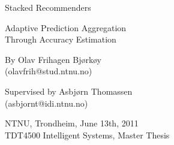 \null\vspace{6em}
{
\setlength{\parindent}{0em}
\setlength{\parskip}{1em}
\centering

\HUGE
Stacked Recommenders\\
\LARGE
\vspace{1em}

Adaptive Prediction Aggregation\\
Through Accuracy Estimation\\

\vspace{2em}
\HUGE
\aldine
\LARGE
\vspace{1em}
\Large

By Olav Frihagen Bjørkøy\\
(olavfrih@stud.ntnu.no)\\

\vspace{1em}

Supervised by Asbjørn Thomassen\\
(asbjornt@idi.ntnu.no)\\

\vspace{1em}

NTNU, Trondheim, June 13th, 2011 \\
TDT4500 Intelligent Systems, Master Thesis \\

\vfill

}
\clearpage
